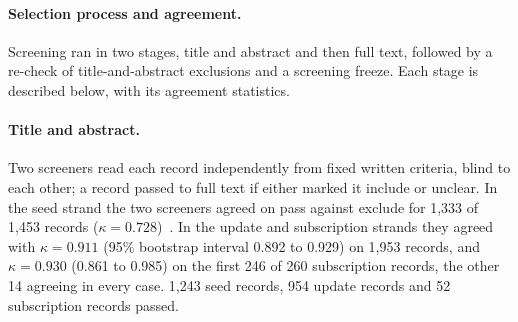 \documentclass[acmsmall,screen]{acmart}
\begin{document}
\paragraph{Selection process and agreement.}
\label{sec:s-selection}
Screening ran in two stages, title and abstract and then full text, followed by a re-check of title-and-abstract exclusions and a screening freeze. Each stage is described below, with its agreement statistics.

\paragraph{Title and abstract.}
Two screeners read each record independently from fixed written criteria, blind to each other; a record passed to full text if either marked it include or unclear. %
In the seed strand the two screeners agreed on pass against exclude for 1,333 of 1,453 records ($\kappa=0.728$)~\cite{cohen1960coefficient}. %
In the update and subscription strands they agreed with $\kappa=0.911$ (95\% bootstrap interval 0.892 to 0.929) on 1,953 records, and $\kappa=0.930$ (0.861 to 0.985) on the first 246 of 260 subscription records, the other 14 agreeing in every case. %
1,243 seed records, 954 update records and 52 subscription records passed. %
\end{document}
